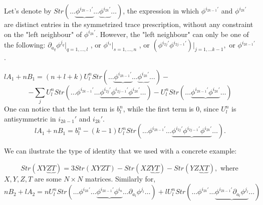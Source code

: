 \documentclass[a4paper,12pt]{article}
\begin{document}
Let's denote by $ Str\left(\ldots \underbrace{\phi^{i_{2k-1}'}}\ldots \underbrace{\phi^{i_{2k}'}}\ldots \right) $, the expression in which $\phi^{i_{2k-1}'}$ and $\phi^{i_{2k}'}$ are distinct entries in the symmetrized trace prescription, without any constraint on the "left neighbour" of  $\phi^{i_{2k}'}$. However, the "left neighbour" can only be one of the following: $\partial_{a_q}\phi^{j_q}|_{q=1,\ldots ,l}$ , or $\phi^{i_s}|_{s=1,\ldots ,n}$ , or $(\phi^{i_{2j}'}\phi^{i_{2j-1}'})|_{j=1,\ldots k-1},$   or $\phi^{i_{2k-1}'}$. 

$ lA_1+nB_1=(n+l+k)U^n_l Str\left(\ldots \underbrace{\phi^{i_{2k-1}'}}\ldots \underbrace{{\phi^{i_{2k}'}}}\ldots \right) - $
\begin{equation}
-\sum_{j}U^n_l Str\left(\ldots \phi^{i_{2k-1}'}\ldots \underbrace{\phi^{i_{2j}'}\phi^{i_{2j-1}'}\phi^{i_{2k}'}}\ldots \right)-U^n_l Str\left(\ldots \underbrace{\phi^{i_{2k-1}'}\phi^{i_{2k}'}}\ldots \right)
\end{equation}
One can notice that the last term is $b^n_l$, while the first term is 0, since $U^n_l$ is antisymmetric in $i_{2k-1}'$ and $i_{2k}'$. 
\begin{equation}
lA_1+nB_1=b^n_l -(k-1)U^n_l Str\left(\ldots \phi^{i_{2k-1}'}\ldots \underbrace{\phi^{i_{2j}'}\phi^{i_{2j-1}'}\phi^{i_{2k}'}}\ldots \right).
\end{equation}

    We can  ilustrate the type of identity that we used with a concrete  example:

 
$\hspace{1cm}Str\left(XY\underbrace{ZT}\right)=3Str\left(XYZT\right)-Str\left(XZ\underbrace{YT}\right)-Str\left(YZ\underbrace{XT}\right),$ \newline
where $X,Y,Z,T$ are some $N\times N$ matrices.
\newline
Similarly for,
\begin{equation}
nB_2+lA_2= n U^n_l Str\left(\ldots \phi^{i_{2k}'}\ldots \underbrace{\phi^{i_{2k-1}'}\phi^{i_n}}\ldots \partial_{a_l}\phi^{j_l}\ldots \right) +l U^n_l Str\left(\ldots \phi^{i_{2k}'}\ldots \underbrace{\phi^{i_{2k-1}'}\partial_{a_l}\phi^{j_l}}\ldots \right)
\end{equation}
\end{document}
